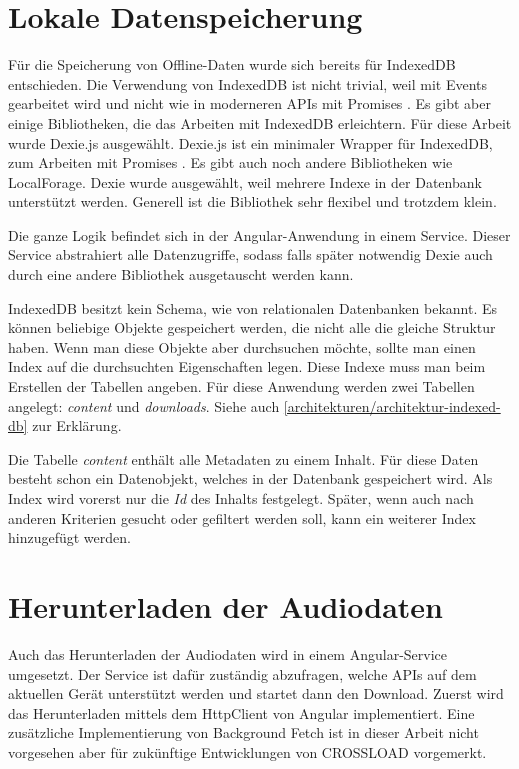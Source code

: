 \section{Lokale Datenspeicherung}
\label{Kap5:Speicherung}
Für die Speicherung von Offline-Daten wurde sich bereits für IndexedDB entschieden. Die Verwendung von IndexedDB ist nicht trivial, weil mit Events gearbeitet wird und nicht wie in moderneren APIs mit Promises \autocite{mdn-indexeddb}. Es gibt aber einige Bibliotheken, die das Arbeiten mit IndexedDB erleichtern. Für diese Arbeit wurde Dexie.js ausgewählt. Dexie.js ist ein minimaler Wrapper für IndexedDB, zum Arbeiten mit Promises \autocite{dexie}. Es gibt auch noch andere Bibliotheken wie LocalForage. Dexie wurde ausgewählt, weil mehrere Indexe in der Datenbank unterstützt werden. Generell ist die Bibliothek sehr flexibel und trotzdem klein.

Die ganze Logik befindet sich in der Angular-Anwendung in einem Service. Dieser Service abstrahiert alle Datenzugriffe, sodass falls später notwendig Dexie auch durch eine andere Bibliothek ausgetauscht werden kann. 

IndexedDB besitzt kein Schema, wie von relationalen Datenbanken bekannt. Es können beliebige Objekte gespeichert werden, die nicht alle die gleiche Struktur haben. Wenn man diese Objekte aber durchsuchen möchte, sollte man einen Index auf die durchsuchten Eigenschaften legen. Diese Indexe muss man beim Erstellen der Tabellen angeben. Für diese Anwendung werden zwei Tabellen angelegt: \emph{content} und \emph{downloads}. Siehe auch \autoref{architekturen/architektur-indexed-db} zur Erklärung.

Die Tabelle \emph{content} enthält alle Metadaten zu einem Inhalt. Für diese Daten besteht schon ein Datenobjekt, welches in der Datenbank gespeichert wird. Als Index wird vorerst nur die \emph{Id} des Inhalts festgelegt. Später, wenn auch nach anderen Kriterien gesucht oder gefiltert werden soll, kann ein weiterer Index hinzugefügt werden. 

\section{Herunterladen der Audiodaten}
Auch das Herunterladen der Audiodaten wird in einem Angular-Service umgesetzt. Der Service ist dafür zuständig abzufragen, welche APIs auf dem aktuellen Gerät unterstützt werden und startet dann den Download. Zuerst wird das Herunterladen mittels dem HttpClient von Angular implementiert. Eine zusätzliche Implementierung von Background Fetch ist in dieser Arbeit nicht vorgesehen aber für zukünftige Entwicklungen von CROSSLOAD vorgemerkt. 

